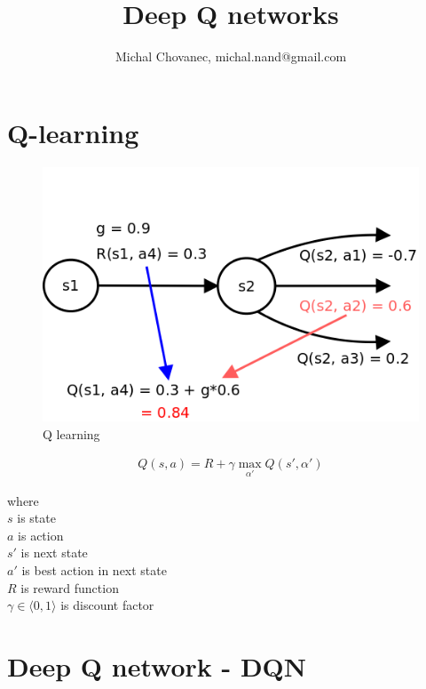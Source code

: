 \documentclass[10pt,a4paper]{article}
\begin{document}
\title{Deep Q networks}
\author{Michal Chovanec, michal.nand@gmail.com}
\date{}
\maketitle
\thispagestyle{empty}

\section{Q-learning}


\begin{figure}[!htb]
  \centering
  \includegraphics[scale=0.3]{../../diagrams/q_learning_detail.png}
  \caption{Q learning}
  \label{img:q_learning}
\end{figure}

\begin{align}
Q(s, a) = R + \gamma \max \limits_{\alpha'} Q(s', \alpha')
\label{eq:q_learning}
\end{align}

where \\
$s$ is state \\
$a$ is action \\
$s'$ is next state \\
$a'$ is best action in next state \\
$R$ is reward function \\
$\gamma \in \langle 0, 1 \rangle$ is discount factor \\


\section{Deep Q network - DQN}
\end{document}
